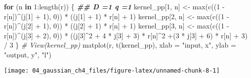\documentclass[
]{article}
\newenvironment{Shaded}{\begin{snugshade}}{\end{snugshade}}
\newcommand{\AttributeTok}[1]{\textcolor[rgb]{0.77,0.63,0.00}{#1}}
\newcommand{\CommentTok}[1]{\textcolor[rgb]{0.56,0.35,0.01}{\textit{#1}}}
\newcommand{\ControlFlowTok}[1]{\textcolor[rgb]{0.13,0.29,0.53}{\textbf{#1}}}
\newcommand{\DecValTok}[1]{\textcolor[rgb]{0.00,0.00,0.81}{#1}}
\newcommand{\DocumentationTok}[1]{\textcolor[rgb]{0.56,0.35,0.01}{\textbf{\textit{#1}}}}
\newcommand{\FunctionTok}[1]{\textcolor[rgb]{0.00,0.00,0.00}{#1}}
\newcommand{\NormalTok}[1]{#1}
\newcommand{\OtherTok}[1]{\textcolor[rgb]{0.56,0.35,0.01}{#1}}
\newcommand{\SpecialCharTok}[1]{\textcolor[rgb]{0.00,0.00,0.00}{#1}}
\newcommand{\StringTok}[1]{\textcolor[rgb]{0.31,0.60,0.02}{#1}}
\begin{document}
\begin{Shaded}
\begin{Highlighting}[]
\ControlFlowTok{for}\NormalTok{ (n }\ControlFlowTok{in} \DecValTok{1}\SpecialCharTok{:}\FunctionTok{length}\NormalTok{(r)) \{}
  \DocumentationTok{\#\# D =1 q =1}
\NormalTok{  kernel\_pp[}\DecValTok{1}\NormalTok{, n] }\OtherTok{\textless{}{-}} \FunctionTok{max}\NormalTok{(}\FunctionTok{c}\NormalTok{((}\DecValTok{1} \SpecialCharTok{{-}}\NormalTok{ r[n])}\SpecialCharTok{\^{}}\NormalTok{(j[}\DecValTok{1}\NormalTok{] }\SpecialCharTok{+} \DecValTok{1}\NormalTok{), }\DecValTok{0}\NormalTok{)) }\SpecialCharTok{*}\NormalTok{ ((j[}\DecValTok{1}\NormalTok{] }\SpecialCharTok{+} \DecValTok{1}\NormalTok{) }\SpecialCharTok{*}\NormalTok{ r[n] }\SpecialCharTok{+} \DecValTok{1}\NormalTok{)}
\NormalTok{  kernel\_pp[}\DecValTok{2}\NormalTok{, n] }\OtherTok{\textless{}{-}} \FunctionTok{max}\NormalTok{(}\FunctionTok{c}\NormalTok{((}\DecValTok{1} \SpecialCharTok{{-}}\NormalTok{ r[n])}\SpecialCharTok{\^{}}\NormalTok{(j[}\DecValTok{2}\NormalTok{] }\SpecialCharTok{+} \DecValTok{1}\NormalTok{), }\DecValTok{0}\NormalTok{)) }\SpecialCharTok{*}\NormalTok{ ((j[}\DecValTok{2}\NormalTok{] }\SpecialCharTok{+} \DecValTok{1}\NormalTok{) }\SpecialCharTok{*}\NormalTok{ r[n] }\SpecialCharTok{+} \DecValTok{1}\NormalTok{)}
\NormalTok{  kernel\_pp[}\DecValTok{3}\NormalTok{, n] }\OtherTok{\textless{}{-}} \FunctionTok{max}\NormalTok{(}\FunctionTok{c}\NormalTok{((}\DecValTok{1} \SpecialCharTok{{-}}\NormalTok{ r[n])}\SpecialCharTok{\^{}}\NormalTok{(j[}\DecValTok{3}\NormalTok{] }\SpecialCharTok{+} \DecValTok{2}\NormalTok{), }\DecValTok{0}\NormalTok{)) }\SpecialCharTok{*}\NormalTok{ ((j[}\DecValTok{3}\NormalTok{]}\SpecialCharTok{\^{}}\DecValTok{2} \SpecialCharTok{+} \DecValTok{4} \SpecialCharTok{*}\NormalTok{ j[}\DecValTok{3}\NormalTok{] }\SpecialCharTok{+} \DecValTok{3}\NormalTok{) }\SpecialCharTok{*}\NormalTok{ r[n]}\SpecialCharTok{\^{}}\DecValTok{2} \SpecialCharTok{+}\NormalTok{(}\DecValTok{3} \SpecialCharTok{*}\NormalTok{ j[}\DecValTok{3}\NormalTok{] }\SpecialCharTok{+} \DecValTok{6}\NormalTok{) }\SpecialCharTok{*}\NormalTok{ r[n] }\SpecialCharTok{+} \DecValTok{3}\NormalTok{) }\SpecialCharTok{/} \DecValTok{3}
\NormalTok{\}}
\CommentTok{\# View(kernel\_pp)}
\FunctionTok{matplot}\NormalTok{(r, }\FunctionTok{t}\NormalTok{(kernel\_pp), }
        \AttributeTok{xlab =} \StringTok{"input, x"}\NormalTok{, }\AttributeTok{ylab =} \StringTok{"output, y"}\NormalTok{, }\StringTok{"l"}\NormalTok{)}
\end{Highlighting}
\end{Shaded}

\begin{center}\texttt{[image: 04\_gaussian\_ch4\_files/figure-latex/unnamed-chunk-8-1]} \end{center}
\end{document}
